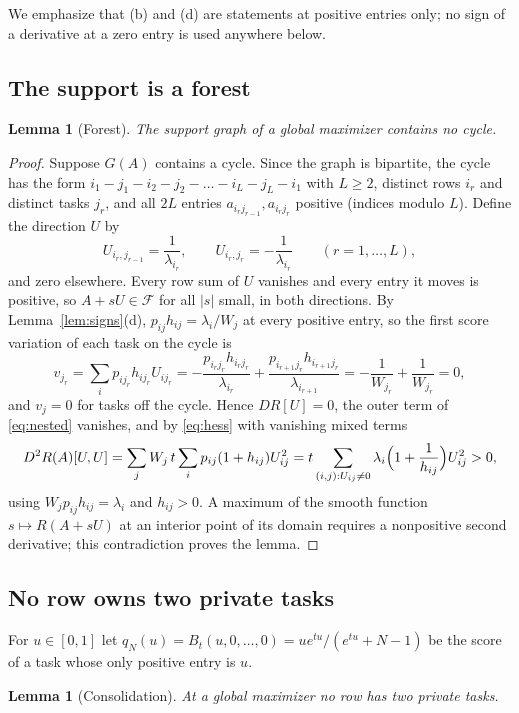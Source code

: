 \documentclass[11pt]{article}
\theoremstyle{plain}
\newtheorem{lemma}[theorem]{Lemma}
\theoremstyle{definition}
\theoremstyle{remark}
\newcommand{\Feas}{\mathcal{F}}
\begin{document}
We emphasize that (b) and (d) are statements at positive entries only; no sign of a derivative at a zero entry is used anywhere below.

\subsection{The support is a forest}

\begin{lemma}[Forest]\label{lem:forest}
The support graph of a global maximizer contains no cycle.
\end{lemma}

\begin{proof}
Suppose $G(A)$ contains a cycle. Since the graph is bipartite, the cycle has the form $i_1-j_1-i_2-j_2-\dots-i_L-j_L-i_1$ with $L\ge2$, distinct rows $i_r$ and distinct tasks $j_r$, and all $2L$ entries $a_{i_rj_{r-1}},a_{i_rj_r}$ positive (indices modulo $L$). Define the direction $U$ by
\[
 U_{i_r,j_{r-1}}=\frac1{\lambda_{i_r}},\qquad U_{i_r,j_r}=-\frac1{\lambda_{i_r}}\qquad(r=1,\dots,L),
\]
and zero elsewhere. Every row sum of $U$ vanishes and every entry it moves is positive, so $A+sU\in\Feas$ for all $|s|$ small, in both directions. By Lemma~\ref{lem:signs}(d), $p_{ij}h_{ij}=\lambda_i/W_j$ at every positive entry, so the first score variation of each task on the cycle is
\[
 v_{j_r}=\sum_ip_{ij_r}h_{ij_r}U_{ij_r}=-\frac{p_{i_rj_r}h_{i_rj_r}}{\lambda_{i_r}}+\frac{p_{i_{r+1}j_r}h_{i_{r+1}j_r}}{\lambda_{i_{r+1}}}=-\frac1{W_{j_r}}+\frac1{W_{j_r}}=0,
\]
and $v_j=0$ for tasks off the cycle. Hence $DR[U]=0$, the outer term of \eqref{eq:nested} vanishes, and by \eqref{eq:hess} with vanishing mixed terms
\[
 D^2R(A)[U,U]=\sum_jW_j\,t\sum_ip_{ij}(1+h_{ij})U_{ij}^2=t\sum_{(i,j):U_{ij}\ne0}\lambda_i\Bigl(1+\frac1{h_{ij}}\Bigr)U_{ij}^2>0,
\]
using $W_jp_{ij}h_{ij}=\lambda_i$ and $h_{ij}>0$. A maximum of the smooth function $s\mapsto R(A+sU)$ at an interior point of its domain requires a nonpositive second derivative; this contradiction proves the lemma.
\end{proof}

\subsection{No row owns two private tasks}

For $u\in[0,1]$ let $q_N(u)=B_t(u,0,\dots,0)=ue^{tu}/(e^{tu}+N-1)$ be the score of a task whose only positive entry is $u$.

\begin{lemma}[Consolidation]\label{lem:private}
At a global maximizer no row has two private tasks.
\end{lemma}
\end{document}
